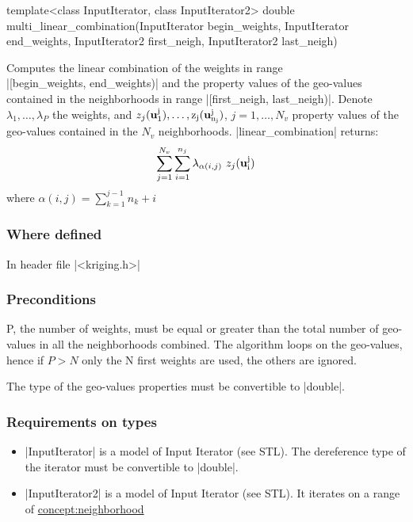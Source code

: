 \documentclass[12pt,twoside]{report}
\newcommand{\mloc}[1]{\rm{\bf #1}}
\begin{document}
\begin{code}
template<class InputIterator, class InputIterator2>
double
multi_linear_combination(InputIterator begin_weights, InputIterator end_weights,
                         InputIterator2 first_neigh, InputIterator2 last_neigh)

\end{code}



Computes the linear combination of the weights in range \\ |[begin_weights, end_weights)| and the property values of the geo-values contained in the neighborhoods in range |[first_neigh, last_neigh)|. Denote $\lambda_1,\ldots,\lambda_P$ the weights, and $z_j(\mloc{u}_1^j),\ldots,z_j(\mloc{u}_{n_j}^j)$, $j=1,\ldots,N_v$ property values of the geo-values contained in the $N_v$ neighborhoods. |linear_combination| returns: 
\begin{displaymath}
\sum_{j=1}^{N_v} \sum_{i=1}^{n_j} \lambda_{\alpha(i,j)} \ z_j(\mloc{u}_i^j) 
\end{displaymath}
\noindent where $\alpha(i,j) = \sum_{k=1}^{j-1} n_k + i$

\htmlrule[CLEAR=all]  \subsubsection*{Where defined}
In header file |<kriging.h>|


\htmlrule[CLEAR=all]  \subsubsection*{Preconditions}
P, the number of weights, must be equal or greater than the total number of geo-values in all the neighborhoods combined.
The algorithm loops on the geo-values, hence if $P>N$ only the N first weights are used, the others are ignored.

The type of the geo-values properties must be convertible to |double|.


\htmlrule[CLEAR=all]  \subsubsection*{Requirements on types}
\begin{itemize}
\item |InputIterator| is a model of Input Iterator (see STL). The dereference type of the iterator must be convertible to |double|.
\item |InputIterator2| is a model of Input Iterator (see STL). It iterates on a range of \hyperref{Neighborhood}{Neighborhood (see Section}{)}{concept:neighborhood}
\end{itemize}
\end{document}
